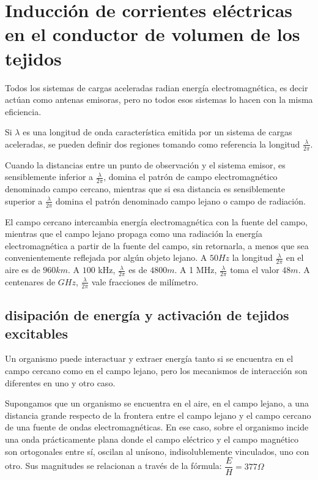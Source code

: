 \section{Inducción de corrientes eléctricas en el conductor de volumen de los tejidos}

Todos los sistemas de cargas aceleradas radian energía electromagnética, es decir actúan como antenas emisoras, pero no todos esos sistemas lo hacen con la misma eficiencia.

Si $\lambda$ es una longitud de onda característica emitida por un sistema de cargas aceleradas, se pueden definir dos regiones tomando como referencia la longitud $\frac{\lambda}{2\pi}$.

Cuando la distancias entre un punto de observación y el sistema emisor, es sensiblemente inferior a $\frac{\lambda}{2\pi}$, domina el patrón de campo electromagnético denominado campo cercano, mientras que si esa distancia es sensiblemente superior a $\frac{\lambda}{2\pi}$ domina el patrón denominado campo lejano o campo de radiación.

El campo cercano intercambia energía electromagnética con la fuente del campo, mientras que el campo lejano propaga como una radiación la energía electromagnética a partir de la fuente del campo, sin retornarla, a menos que sea convenientemente reflejada por algún objeto lejano.
A $50 Hz$ la longitud $\frac{\lambda}{2\pi}$ en el aire es de $960 km$. A $100$ kHz, $\frac{\lambda}{2\pi}$ es de $4800 m$. A 1 MHz, $\frac{\lambda}{2\pi}$ toma el valor $48 m$. A centenares de $GHz$, $\frac{\lambda}{2\pi}$ vale fracciones de milímetro.


\subsection{ disipación de energía y activación de tejidos excitables}

Un organismo puede interactuar y extraer energía tanto si se encuentra en el campo cercano como en el campo lejano, pero los mecanismos de interacción son diferentes en uno y otro caso.

Supongamos que un organismo se encuentra en el aire, en el campo lejano, a una distancia grande respecto de la frontera entre el campo lejano y el campo cercano de una fuente de ondas electromagnéticas. En ese caso, sobre el organismo incide una onda prácticamente plana donde el campo eléctrico y el campo magnético son ortogonales entre sí, oscilan al unísono, indisolublemente vinculados, uno con otro. Sus magnitudes se relacionan a través de la fórmula: $\dfrac{E}{H}=377\Omega$

